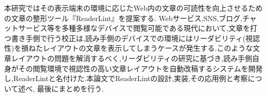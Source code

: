 \begin{jabstract}
    本研究ではその表示端末の環境に応じたWeb内の文章の可読性を向上させるための文章の整形ツール『ReaderLint』を提案する. Webサービス,SNS,ブログ,チャットサービス等を多種多様なデバイスで閲覧可能である現代において,文章を打つ書き手側で行う校正は,読み手側のデバイスでの環境にはリーダビリティ(視認性)を損ねたレイアウトの文章を表示してしまうケースが発生する.このような文章レイアウトの問題を解消するべく,リーダビリティの研究に基づき,読み手側自身がその閲覧環境で視認性の高い文章レイアウトを自動改稿するシステムを開発し,ReaderLintと名付けた.本論文でReaderLintの設計,実装,その応用例と考察について述べ, 最後にまとめを行う.
\end{jabstract}


